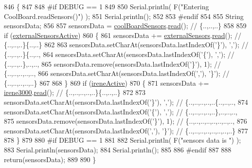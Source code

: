 \begin{DoxyCode}
846 \{
847 
848 \textcolor{preprocessor}{#if DEBUG == 1}
849 
850     Serial.println( F(\textcolor{stringliteral}{"Entering CoolBoard.readSensors()"}) );
851     Serial.println();
852 
853 \textcolor{preprocessor}{#endif}
854 
855     String sensorsData;
856 
857     sensorsData = \hyperlink{classCoolBoard_af102be5288bd7f7a8e59b13f86e26a00}{coolBoardSensors}.\hyperlink{classCoolBoardSensors_a91badb2539d91fda8679f2a597874c48}{read}(); \textcolor{comment}{// \{..,..,..\}}
858     
859     \textcolor{keywordflow}{if} (\hyperlink{classCoolBoard_a638b00b76aeb819ecfd4c10b8cdd7bb7}{externalSensorsActive})
860     \{
861         sensorsData += \hyperlink{classCoolBoard_a09e26264839c65873eb56af476eff6b2}{externalSensors}.\hyperlink{classExternalSensors_a53177b81eca3be89508b5511ddcd00fc}{read}(); \textcolor{comment}{// \{..,..,..\}\{..,..\}}
862 
863         sensorsData.setCharAt(sensorsData.lastIndexOf(\textcolor{charliteral}{'\}'}), \textcolor{charliteral}{','}); \textcolor{comment}{// \{..,..,..\}\{..,..,}
864         sensorsData.setCharAt(sensorsData.lastIndexOf(\textcolor{charliteral}{'\{'}), \textcolor{charliteral}{','}); \textcolor{comment}{// \{..,..,..\},..,..,}
865         sensorsData.remove(sensorsData.lastIndexOf(\textcolor{charliteral}{'\}'}), 1); \textcolor{comment}{// \{..,..,..,..,..,}
866         sensorsData.setCharAt(sensorsData.lastIndexOf(\textcolor{charliteral}{','}), \textcolor{charliteral}{'\}'}); \textcolor{comment}{// \{..,..,..,..,..\}}
867 
868     \}
869     \textcolor{keywordflow}{if} (\hyperlink{classCoolBoard_a9c3f7ac625481ee2ae802a25d97a4ae0}{ireneActive})
870     \{
871         sensorsData += \hyperlink{classCoolBoard_ad103718ce316006c4695b8eb312eaf11}{irene3000}.\hyperlink{classIrene3000_a852a170feea994ea1df01c6b245b5d9a}{read}(); \textcolor{comment}{// \{..,..,..,..,..\}\{..,..,..\}}
872 
873         sensorsData.setCharAt(sensorsData.lastIndexOf(\textcolor{charliteral}{'\}'}), \textcolor{charliteral}{','}); \textcolor{comment}{// \{..,..,..,..,..\{..,..,..,}
874         sensorsData.setCharAt(sensorsData.lastIndexOf(\textcolor{charliteral}{'\{'}), \textcolor{charliteral}{','}); \textcolor{comment}{// \{..,..,..,..,..\},..,..,..,}
875         sensorsData.remove(sensorsData.lastIndexOf(\textcolor{charliteral}{'\}'}), 1); \textcolor{comment}{// \{..,..,..,..,..,..,..,..,}
876         sensorsData.setCharAt(sensorsData.lastIndexOf(\textcolor{charliteral}{','}), \textcolor{charliteral}{'\}'}); \textcolor{comment}{// \{..,..,..,..,..,..,..,..\}}
877         
878     \}
879     
880 \textcolor{preprocessor}{#if DEBUG == 1}
881 
882     Serial.println( F(\textcolor{stringliteral}{"sensors data is "}) );
883     Serial.println(sensorsData);
884     Serial.println();
885 
886 \textcolor{preprocessor}{#endif}
887 
888     \textcolor{keywordflow}{return}(sensorsData);
889 
890 \}
\end{DoxyCode}
